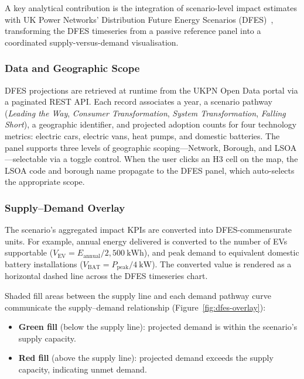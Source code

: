 A key analytical contribution is the integration of scenario-level impact estimates with UK Power Networks' Distribution Future Energy Scenarios (DFES)~\cite{ukpn-dfes}, transforming the DFES timeseries from a passive reference panel into a coordinated supply-versus-demand visualisation.

\subsubsection{Data and Geographic Scope}

DFES projections are retrieved at runtime from the UKPN Open Data portal via a paginated REST API. Each record associates a year, a scenario pathway (\emph{Leading the Way}, \emph{Consumer Transformation}, \emph{System Transformation}, \emph{Falling Short}), a geographic identifier, and projected adoption counts for four technology metrics: electric cars, electric vans, heat pumps, and domestic batteries. The panel supports three levels of geographic scoping---Network, Borough, and LSOA---selectable via a toggle control. When the user clicks an H3 cell on the map, the LSOA code and borough name propagate to the DFES panel, which auto-selects the appropriate scope.

\subsubsection{Supply--Demand Overlay}

The scenario's aggregated impact KPIs are converted into DFES-commensurate units. For example, annual energy delivered is converted to the number of EVs supportable ($V_{\text{EV}} = E_{\text{annual}} / 2{,}500~\text{kWh}$), and peak demand to equivalent domestic battery installations ($V_{\text{BAT}} = P_{\text{peak}} / 4~\text{kW}$). The converted value is rendered as a horizontal dashed line across the DFES timeseries chart.

Shaded fill areas between the supply line and each demand pathway curve communicate the supply--demand relationship (Figure~\ref{fig:dfes-overlay}):

\begin{itemize}[nosep]
    \item \textbf{Green fill} (below the supply line): projected demand is within the scenario's supply capacity.
    \item \textbf{Red fill} (above the supply line): projected demand exceeds the supply capacity, indicating unmet demand.
\end{itemize}

